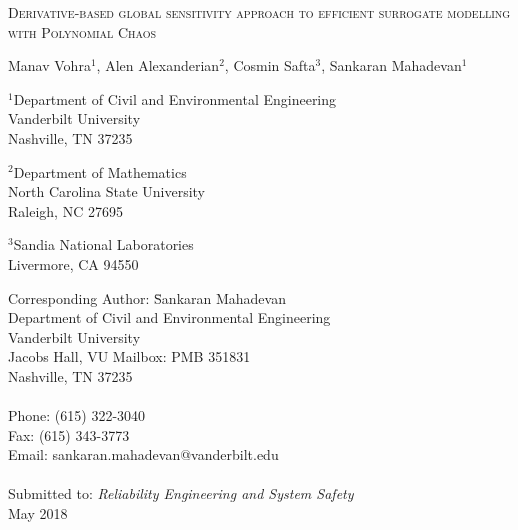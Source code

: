 \begin{center}
\textsc{
Derivative-based global sensitivity approach to efficient surrogate modelling
with Polynomial Chaos
}

\bigskip 
\bigskip 

Manav Vohra$^{1}$, Alen Alexanderian$^{2}$, Cosmin Safta$^{3}$, Sankaran Mahadevan$^{1}$

\bigskip
\bigskip

\normalsize
$^1$Department of Civil and Environmental Engineering\\
Vanderbilt University\\
Nashville, TN 37235\\

\bigskip

$^2$Department of Mathematics\\
North Carolina State University\\
Raleigh, NC 27695\\

\bigskip

$^3$Sandia National Laboratories\\
Livermore, CA 94550\\

\end{center}

\vspace{6cm}

\begin{tabbing}
Corresponding Author: \hspace{5mm} \= Sankaran Mahadevan\\
       \>  Department of Civil and Environmental Engineering\\
       \>  Vanderbilt University\\
        Jacobs Hall, VU Mailbox: PMB 351831 \\
       \>  Nashville, TN 37235 \\
       \> \\
Phone: \> (615) 322-3040 \\
Fax:   \> (615) 343-3773 \\
Email: \>  sankaran.mahadevan@vanderbilt.edu   \\
\\
Submitted to: \> \textit{Reliability Engineering and System Safety} \\
\>  May 2018\\

\bigskip
\end{tabbing}

\clearpage

